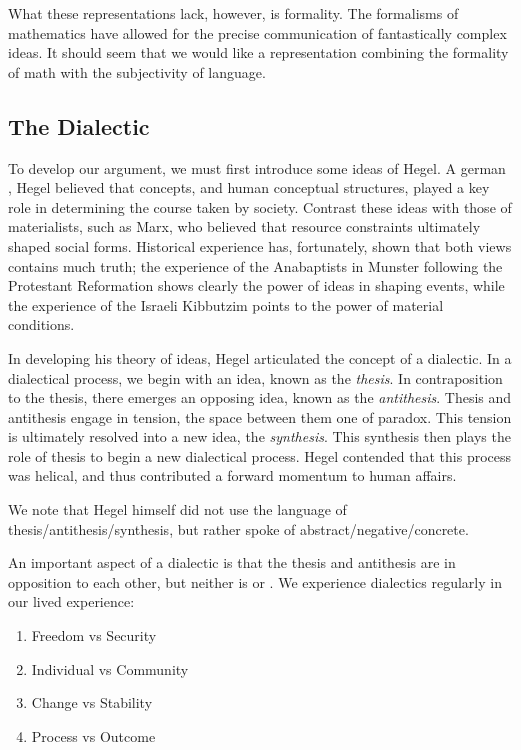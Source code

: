 \documentclass[12pt]{book}
\begin{document}
What these representations lack, however, is formality.
The formalisms of mathematics have allowed for the precise communication of fantastically complex ideas.
It should seem that we would like a representation combining the formality of math with the subjectivity of language.


\subsection{The Dialectic}

To develop our argument, we must first introduce some ideas of Hegel.
A german , Hegel believed that concepts, and human conceptual structures, played a key role in determining the course taken by society.
Contrast these ideas with those of materialists, such as Marx, who believed that resource constraints ultimately shaped social forms.
Historical experience has, fortunately, shown that both views contains much truth; the experience of the Anabaptists in Munster following the Protestant Reformation\cite{carlin} shows clearly the power of ideas in shaping events, while the experience of the Israeli Kibbutzim points to the power of material conditions.

In developing his theory of ideas, Hegel articulated the concept of a dialectic.
In a dialectical process, we begin with an idea, known as the \textit{thesis}.
In contraposition to the thesis, there emerges an opposing idea, known as the \textit{antithesis}.
Thesis and antithesis engage in tension, the space between them one of paradox.
This tension is ultimately resolved into a new idea, the \textit{synthesis}.
This synthesis then plays the role of thesis to begin a new dialectical process.
Hegel contended that this process was helical, and thus contributed a forward momentum to human affairs.

We note that Hegel himself did not use the language of thesis/antithesis/synthesis, but rather spoke of abstract/negative/concrete.

An important aspect of a dialectic is that the thesis and antithesis are in opposition to each other, but neither is  or .
We experience dialectics regularly in our lived experience:

\begin{enumerate}
  \item Freedom vs Security
  \item Individual vs Community
  \item Change vs Stability
  \item Process vs Outcome
\end{enumerate}
\end{document}
